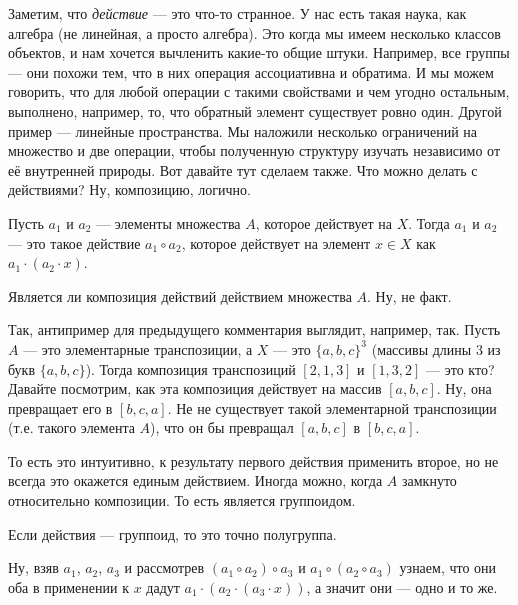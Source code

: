 \documentclass{article}
\begin{document}
\begin{itemize}
        \begin{Comment}
            Заметим, что \textit{действие} --- это что-то странное. У нас есть такая наука, как алгебра (не линейная, а просто алгебра). Это когда мы имеем несколько классов объектов, и нам хочется вычленить какие-то общие штуки. Например, все группы --- они похожи тем, что в них операция ассоциативна и обратима. И мы можем говорить, что для любой операции с такими свойствами и чем угодно остальным, выполнено, например, то, что обратный элемент существует ровно один. Другой пример --- линейные пространства. Мы наложили несколько ограничений на множество и две операции, чтобы полученную структуру изучать независимо от её внутренней природы. Вот давайте тут сделаем также. Что можно делать с действиями? Ну, композицию, логично.
        \end{Comment}
        \dfn Пусть $a_1$ и $a_2$ --- элементы множества $A$, которое действует на $X$. Тогда  $a_1$ и $a_2$ --- это такое действие $a_1\circ a_2$, которое действует на элемент $x\in X$ как $a_1\cdot(a_2\cdot x)$.
        \begin{Comment}
            Является ли композиция действий действием множества $A$. Ну, не факт.
        \end{Comment}
        \begin{Example}
            Так, антипример для предыдущего комментария выглядит, например, так. Пусть $A$ --- это элементарные транспозиции, а $X$ --- это $\{a,b,c\}^3$ (массивы длины $3$ из букв $\{a,b,c\}$). Тогда композиция транспозиций $[2,1,3]$ и $[1,3,2]$ --- это кто? Давайте посмотрим, как эта композиция действует на массив $[a,b,c]$. Ну, она превращает его в $[b,c,a]$. Не не существует такой элементарной транспозиции (т.е. такого элемента $A$), что он бы превращал $[a,b,c]$ в $[b,c,a]$.
        \end{Example}
        \begin{Comment}
            То есть это интуитивно, к результату первого действия применить второе, но не всегда это окажется единым действием. Иногда можно, когда $A$ замкнуто относительно композиции. То есть является группоидом.
        \end{Comment}
        \thm Если действия --- группоид, то это точно полугруппа.
        \begin{Proof}
            Ну, взяв $a_1$, $a_2$, $a_3$ и рассмотрев $(a_1\circ a_2)\circ a_3$ и $a_1\circ(a_2\circ a_3)$ узнаем, что они оба в применении к $x$ дадут $a_1\cdot(a_2\cdot(a_3\cdot x))$, а значит они --- одно и то же.

\end{Proof}
\end{itemize}
\end{document}
